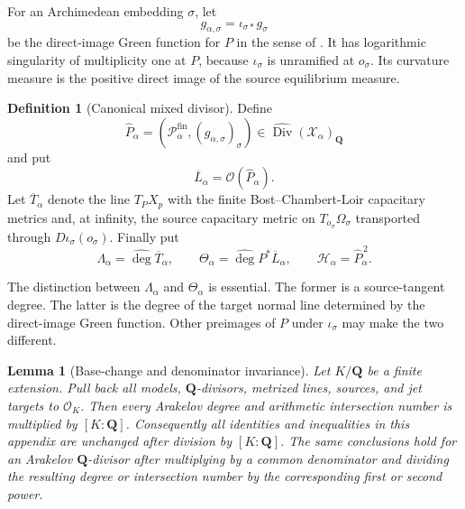 \documentclass[11pt]{article}
\newtheorem{lemma}[lemma]{Lemma}
\theoremstyle{definition}
\newtheorem{definition}[definition]{Definition}
\theoremstyle{remark}
\newcommand{\Q}{\mathbf Q}
\newcommand{\widehatdeg}{\widehat{\deg}}
\newcommand{\Energy}{\mathscr H}
\newcommand{\LambdaAH}{\Lambda}
\begin{document}
For an Archimedean embedding $\sigma$, let
\begin{equation}\label{eq:direct-image-green}
 g_{\alpha,\sigma}=\iota_{\sigma*}g_\sigma
\end{equation}
be the direct-image Green function for $P$ in the sense of
\cite[Sections~5.1 and~7.2]{BostCharles2022}.  It has logarithmic singularity
of multiplicity one at $P$, because $\iota_\sigma$ is unramified at
$o_\sigma$.  Its curvature measure is the positive direct image of the
source equilibrium measure.

\begin{definition}[Canonical mixed divisor]\label{def:mixed-divisor}
Define
\begin{equation}\label{eq:mixed-divisor}
 \widehat P_\alpha=
 \left(\mathscr P_\alpha^{\mathrm{fin}},
       (g_{\alpha,\sigma})_{\sigma}\right)
 \in\widehat{\operatorname{Div}}(\mathscr X_\alpha)_\Q
\end{equation}
and put
\[
 \overline L_\alpha=\mathcal O(\widehat P_\alpha).
\]
Let $\overline T_\alpha$ denote the line $T_PX_p$ with the finite
Bost--Chambert-Loir capacitary metrics and, at infinity, the source
capacitary metric on $T_{o_\sigma}\Omega_\sigma$ transported through
$D\iota_\sigma(o_\sigma)$.  Finally put
\begin{equation}\label{eq:mixed-invariants}
 \LambdaAH_\alpha=\widehatdeg\overline T_\alpha,
 \qquad
 \Theta_\alpha=\widehatdeg P^*\overline L_\alpha,
 \qquad
 \Energy_\alpha=\widehat P_\alpha^{\,2}.
\end{equation}
\end{definition}

The distinction between $\LambdaAH_\alpha$ and $\Theta_\alpha$ is essential.
The former is a source-tangent degree.  The latter is the degree of the target
normal line determined by the direct-image Green function.  Other preimages
of $P$ under $\iota_\sigma$ may make the two different.

\begin{lemma}[Base-change and denominator invariance]
\label{lem:exact-base-change}
Let $K/\Q$ be a finite extension.  Pull back all models, $\Q$-divisors,
metrized lines, sources, and jet targets to $\mathcal O_K$.  Then every
Arakelov degree and arithmetic intersection number is multiplied by
$[K:\Q]$.  Consequently all identities and inequalities in this appendix are
unchanged after division by $[K:\Q]$.  The same conclusions hold for an
Arakelov $\Q$-divisor after multiplying by a common denominator and dividing
the resulting degree or intersection number by the corresponding first or
second power.
\end{lemma}
\end{document}
